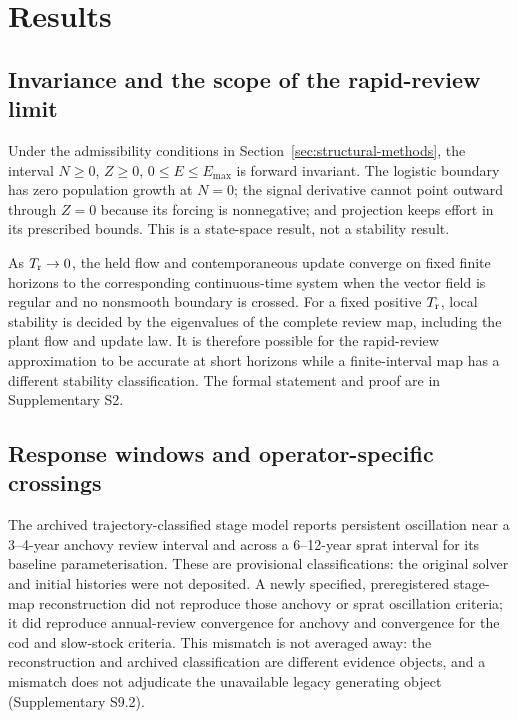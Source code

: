 \section{Results}\label{sec:results}

\subsection{Invariance and the scope of the rapid-review limit}\label{sec:invariance-results}

Under the admissibility conditions in Section~\ref{sec:structural-methods}, the interval \(N\geq0\), \(Z\geq0\), \(0\leq E\leq E_{\max}\) is forward invariant. The logistic boundary has zero population growth at \(N=0\); the signal derivative cannot point outward through \(Z=0\) because its forcing is nonnegative; and projection keeps effort in its prescribed bounds. This is a state-space result, not a stability result.

As \(T_{\mathrm r}\to0\), the held flow and contemporaneous update converge on fixed finite horizons to the corresponding continuous-time system when the vector field is regular and no nonsmooth boundary is crossed. For a fixed positive \(T_{\mathrm r}\), local stability is decided by the eigenvalues of the complete review map, including the plant flow and update law. It is therefore possible for the rapid-review approximation to be accurate at short horizons while a finite-interval map has a different stability classification. The formal statement and proof are in Supplementary S2.

\subsection{Response windows and operator-specific crossings}\label{sec:crossings}

The archived trajectory-classified stage model reports persistent oscillation near a 3--4-year anchovy review interval and across a 6--12-year sprat interval for its baseline parameterisation. These are provisional classifications: the original solver and initial histories were not deposited. A newly specified, preregistered stage-map reconstruction did not reproduce those anchovy or sprat oscillation criteria; it did reproduce annual-review convergence for anchovy and convergence for the cod and slow-stock criteria. This mismatch is not averaged away: the reconstruction and archived classification are different evidence objects, and a mismatch does not adjudicate the unavailable legacy generating object (Supplementary S9.2).


